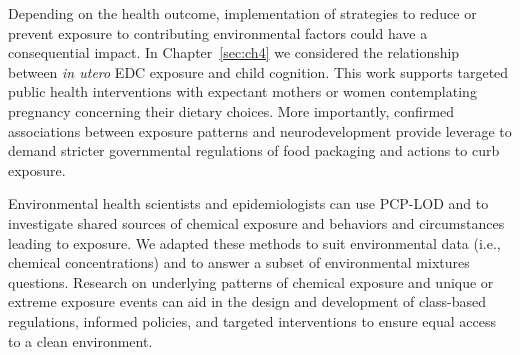 Depending on the health outcome, implementation of strategies to reduce or prevent exposure to contributing environmental factors could have a consequential impact. In Chapter~\ref{sec:ch4} we considered the relationship between \textit{in utero} EDC exposure and child cognition. This work supports targeted public health interventions with expectant mothers or women contemplating pregnancy concerning their dietary choices. More importantly, confirmed associations between exposure patterns and neurodevelopment provide leverage to demand stricter governmental regulations of food packaging and actions to curb exposure.

Environmental health scientists and epidemiologists can use PCP-LOD and \bnmf to investigate shared sources of chemical exposure and behaviors and circumstances leading to exposure. We adapted these methods to suit environmental data (i.e., chemical concentrations) and to answer a subset of environmental mixtures questions. Research on underlying patterns of chemical exposure and unique or extreme exposure events can aid in the design and development of class-based regulations, informed policies, and targeted interventions to ensure equal access to a clean environment.